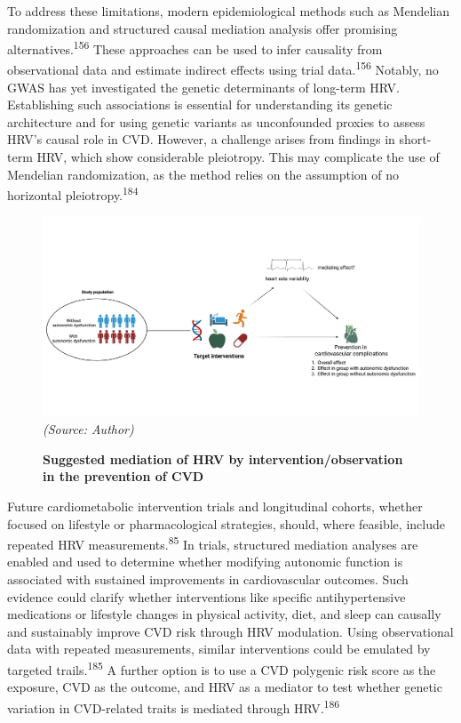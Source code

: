 \documentclass[
  a4paper,
  headsepline=true,
  open=left]{scrbook}
\begin{document}
To address these limitations, modern epidemiological methods such as
Mendelian randomization and structured causal mediation analysis offer
promising alternatives.\textsuperscript{156} These approaches can be
used to infer causality from observational data and estimate indirect
effects using trial data.\textsuperscript{156} Notably, no GWAS has yet
investigated the genetic determinants of long-term HRV. Establishing
such associations is essential for understanding its genetic
architecture and for using genetic variants as unconfounded proxies to
assess HRV's causal role in CVD. However, a challenge arises from
findings in short-term HRV, which show considerable pleiotropy. This may
complicate the use of Mendelian randomization, as the method relies on
the assumption of no horizontal pleiotropy.\textsuperscript{184}

\begin{figure}

{\centering 

\includegraphics{images/Mediation_HRV_1.png} \emph{(Source: Author)}

}

\caption{\label{fig-mediation}\textbf{Suggested mediation of HRV by
intervention/observation in the prevention of CVD}}

\end{figure}

Future cardiometabolic intervention trials and longitudinal cohorts,
whether focused on lifestyle or pharmacological strategies, should,
where feasible, include repeated HRV measurements.\textsuperscript{85}
In trials, structured mediation analyses are enabled and used to
determine whether modifying autonomic function is associated with
sustained improvements in cardiovascular outcomes. Such evidence could
clarify whether interventions like specific antihypertensive medications
or lifestyle changes in physical activity, diet, and sleep can causally
and sustainably improve CVD risk through HRV modulation. Using
observational data with repeated measurements, similar interventions
could be emulated by targeted trails.\textsuperscript{185} A further
option is to use a CVD polygenic risk score as the exposure, CVD as the
outcome, and HRV as a mediator to test whether genetic variation in
CVD-related traits is mediated through HRV.\textsuperscript{186}
\end{document}
